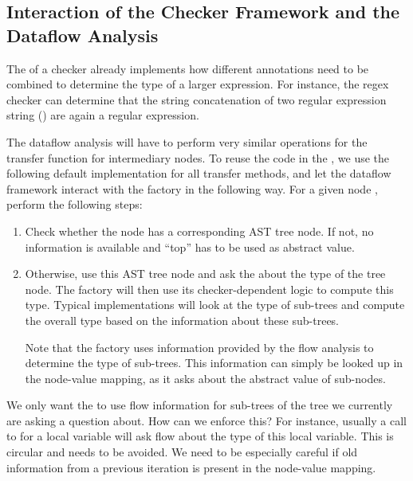 \begin{new}

\subsection{Interaction of the Checker Framework and the Dataflow Analysis}
\label{sec:flow-cf-interaction}

The  of a checker already implements how different annotations
need to be combined to determine the type of a larger expression.  For instance,
the regex checker can determine that the string concatenation of two regular expression
string () are again a regular expression.

The dataflow analysis will have to perform very similar operations for the transfer function
for intermediary nodes.  To reuse the code in the , we
use the following default implementation for all transfer methods, and let
the dataflow framework interact with the factory in the following way.
For a given node , perform the following steps:
\begin{enumerate}
    \item Check whether the node has a corresponding AST tree node. If not, no information is
    available and ``top'' has to be used as abstract value.
    \item Otherwise, use this AST tree node and ask the  about
    the type of the tree node.  The factory will then use its checker-dependent logic
    to compute this type.  Typical implementations will look at the type
    of sub-trees and compute the overall type based on the information about these sub-trees.
    
    Note that the factory uses information provided by the flow analysis to determine
    the type of sub-trees.  This information can simply be looked up in the node-value
    mapping, as it asks about the abstract value of sub-nodes.
\end{enumerate}

\begin{workinprogress}
    We only want the  to use flow information for sub-trees of
    the tree we currently are asking a question about.  How can we enforce this?
    For instance, usually a call to  for a local variable will ask flow
    about the type of this local variable.  This is circular and needs to be avoided.
    We need to be especially careful if old information from a previous iteration is present
    in the node-value mapping.
    

\end{workinprogress}
\end{new}
